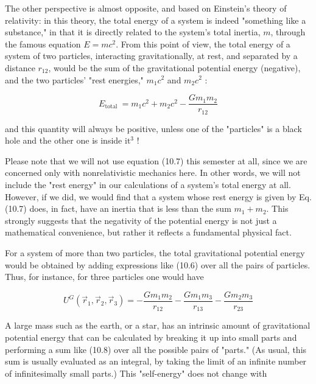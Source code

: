 \documentclass[10pt]{article}
\begin{document}
The other perspective is almost opposite, and based on Einstein's theory of relativity: in this theory, the total energy of a system is indeed "something like a substance," in that it is directly related to the system's total inertia, $m$, through the famous equation $E=m c^{2}$. From this point of view, the total energy of a system of two particles, interacting gravitationally, at rest, and separated by a distance $r_{12}$, would be the sum of the gravitational potential energy (negative), and the two particles' "rest energies," $m_{1} c^{2}$ and $m_{2} c^{2}$ :


\begin{equation*}
E_{\text {total }}=m_{1} c^{2}+m_{2} c^{2}-\frac{G m_{1} m_{2}}{r_{12}} \tag{10.7}
\end{equation*}


and this quantity will always be positive, unless one of the "particles" is a black hole and the other one is inside $\mathrm{it}^{3}$ !

Please note that we will not use equation (10.7) this semester at all, since we are concerned only with nonrelativistic mechanics here. In other words, we will not include the "rest energy" in our calculations of a system's total energy at all. However, if we did, we would find that a system whose rest energy is given by Eq. (10.7) does, in fact, have an inertia that is less than the sum $m_{1}+m_{2}$. This strongly suggests that the negativity of the potential energy is not just a mathematical convenience, but rather it reflects a fundamental physical fact.

For a system of more than two particles, the total gravitational potential energy would be obtained by adding expressions like (10.6) over all the pairs of particles. Thus, for instance, for three particles one would have


\begin{equation*}
U^{G}\left(\vec{r}_{1}, \vec{r}_{2}, \vec{r}_{3}\right)=-\frac{G m_{1} m_{2}}{r_{12}}-\frac{G m_{1} m_{3}}{r_{13}}-\frac{G m_{2} m_{3}}{r_{23}} \tag{10.8}
\end{equation*}


A large mass such as the earth, or a star, has an intrinsic amount of gravitational potential energy that can be calculated by breaking it up into small parts and performing a sum like (10.8) over all the possible pairs of "parts." (As usual, this sum is usually evaluated as an integral, by taking the limit of an infinite number of infinitesimally small parts.) This "self-energy" does not change with
\end{document}
